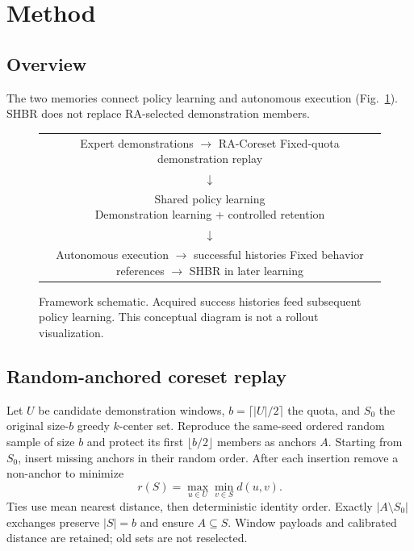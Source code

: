 \section{Method}
\subsection{Overview}
The two memories connect policy learning and autonomous execution
(Fig.~\ref{fig:overview}). SHBR does not replace RA-selected demonstration members.
\begin{figure}[tb]\centering
\begin{tabular}{c}
\fbox{\parbox{0.84\linewidth}{\centering
Expert demonstrations $\rightarrow$ RA-Coreset\\Fixed-quota demonstration replay}}\\[5pt]
$\downarrow$\\[5pt]
\fbox{\parbox{0.84\linewidth}{\centering
Shared policy learning\\Demonstration learning + controlled retention}}\\[5pt]
$\downarrow$\\[5pt]
\fbox{\parbox{0.84\linewidth}{\centering
Autonomous execution $\rightarrow$ successful histories\\
Fixed behavior references $\rightarrow$ SHBR in later learning}}
\end{tabular}
\caption{Framework schematic. Acquired success histories feed subsequent
policy learning. This conceptual diagram is not a rollout visualization.}
\label{fig:overview}\end{figure}
\subsection{Random-anchored coreset replay}
Let $U$ be candidate demonstration windows, $b=\lceil|U|/2\rceil$ the quota,
and $S_0$ the original size-$b$ greedy $k$-center set. Reproduce the same-seed
ordered random sample of size $b$ and protect its first $\lfloor b/2\rfloor$
members as anchors $A$. Starting from $S_0$, insert missing anchors in
their random order. After each insertion remove a non-anchor to minimize
\begin{equation}r(S)=\max_{u\in U}\min_{v\in S}d(u,v).\end{equation}
Ties use mean nearest distance, then deterministic identity order.
Exactly $|A\setminus S_0|$ exchanges preserve $|S|=b$ and ensure $A\subseteq S$.
Window payloads and calibrated distance are retained; old sets are not reselected.
